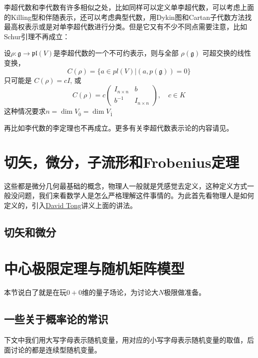 李超代数和李代数有许多相似之处，比如同样可以定义单李超代数，可以考虑上面的Killing型和伴随表示，还可以考虑典型代数，用Dykin图和Cartan子代数方法找最高权表示或是对单李超代数进行分类。但是它又有不少不同点需要注意，比如Schur引理不再成立：
\begin{theorem}[超Schur引理]
	设$\rho:\mathfrak{g}\longrightarrow\mathfrak{pl}(V)$是李超代数的一个不可约表示，则与全部 $\rho(\mathfrak{g})$ 可超交换的线性变换，
	$$C(\rho)=\{a\in pl(V)|(a,p(\mathfrak{g}))=0\}$$
	只可能是 $C(\rho)=cI$, 或
	\[C(\rho)=c\begin{pmatrix}I_{n\times n}&b\\b^{-1}&I_{n\times n}\end{pmatrix},\quad c\in K\]
	这种情况要求$n=\dim V_{\bar 0}=\dim V_{\bar 1}$
\end{theorem}
再比如李代数的李定理也不再成立。更多有关李超代数表示论的内容请见\cite{superlie,WLXJ198301002,Kac:1977em}。
\section{切矢，微分，子流形和Frobenius定理}
这些都是微分几何最基础的概念，物理人一般就是凭感觉去定义，这种定义方式一般没问题，我们来看数学人是怎么严格理解这件事情的。为此首先看物理人是如何定义的，引入\href{https://www.damtp.cam.ac.uk/user/tong/gr.html}{David Tong}讲义上面的讲法。
\subsection{切矢和微分}

\section{中心极限定理与随机矩阵模型}\label{B.5}
本节说白了就是在玩$0+0$维的量子场论，为讨论大$N$极限做准备。
\subsection{一些关于概率论的常识}
下文中我们用大写字母表示随机变量，用对应的小写字母表示随机变量的取值，后面讨论的都是连续型随机变量。

